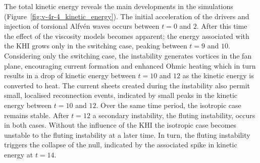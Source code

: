 The total kinetic energy reveals the main developments in the simulations (Figure~\ref{fig:v-4r-4_kinetic_energy}). The initial acceleration of the drivers and injection of torsional Alfv\'en waves occurs between $t=0$ and $2$. After this time the effect of the viscosity models becomes apparent; the energy associated with the KHI grows only in the switching case, peaking between $t=9$ and $10$. Considering only the switching case, the instability generates vortices in the fan plane, encouraging current formation and enhanced Ohmic heating which in turn results in a drop of kinetic energy between $t=10$ and $12$ as the kinetic energy is converted to heat. The current sheets created during the instability also permit small, localised reconnection events, indicated by small peaks in the kinetic energy between $t=10$ and $12$. Over the same time period, the isotropic case remains stable. After $t=12$ a secondary instability, the fluting instability, occurs in both cases. Without the influence of the KHI the isotropic case becomes unstable to the fluting instability at a later time. In turn, the fluting instability triggers the collapse of the null, indicated by the associated spike in kinetic energy at $t=14$.

